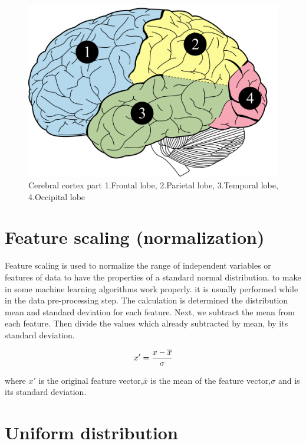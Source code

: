 \begin{figure}[ht]
	\centering
	\includegraphics[scale = 0.32]{chapter3/33.pdf}
	\caption{Cerebral cortex part 1.Frontal lobe, 2.Parietal lobe, 3.Temporal lobe, 4.Occipital lobe}
\end{figure}

\section{Feature scaling (normalization)}

\hspace{1.5cm} Feature scaling is used to normalize the range of independent variables or features of data to have the properties of a standard normal distribution. to make in some machine learning algorithms work properly. it is usually performed while in the data pre-processing step. The calculation is determined the distribution mean and standard deviation for each feature. Next, we subtract the mean from each feature. Then divide the values which already subtracted by mean, by its standard deviation.\cite{ref10}

\begin{equation}\label{1}
	x' = {x-{\overline{x}} \over {\sigma}}
\end{equation}

where $x'$ is the original feature vector,$\overline{x}$ is the mean of the feature vector,$\sigma$ and is its standard deviation.

\newpage
\section{Uniform distribution\cite{ref11}}

